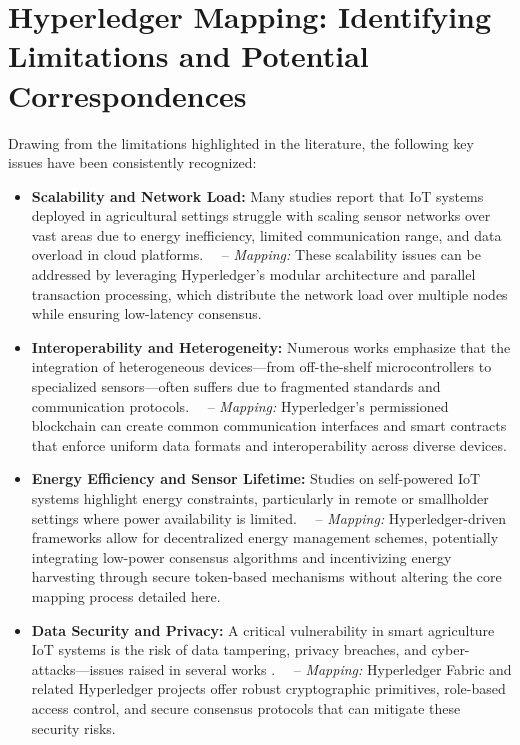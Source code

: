 \documentclass[12pt,onecolumn]{IEEEtran} %
\begin{document}
\section{Hyperledger Mapping: Identifying Limitations and Potential Correspondences}
Drawing from the limitations highlighted in the literature, the following key issues have been consistently recognized:

\begin{itemize}
\item \textbf{Scalability and Network Load:} Many studies \cite{atalla2023iotenabledprecisionagriculture, bayih2022utilizationofinternet, bayih2022utilizationofinternet} report that IoT systems deployed in agricultural settings struggle with scaling sensor networks over vast areas due to energy inefficiency, limited communication range, and data overload in cloud platforms.  
 – \textit{Mapping:} These scalability issues can be addressed by leveraging Hyperledger’s modular architecture and parallel transaction processing, which distribute the network load over multiple nodes while ensuring low-latency consensus.

\item \textbf{Interoperability and Heterogeneity:} Numerous works \cite{bayih2022utilizationofinternet, bayih2022utilizationofinternet, bayih2022utilizationofinternet} emphasize that the integration of heterogeneous devices—from off-the-shelf microcontrollers to specialized sensors—often suffers due to fragmented standards and communication protocols.  
 – \textit{Mapping:} Hyperledger’s permissioned blockchain can create common communication interfaces and smart contracts that enforce uniform data formats and interoperability across diverse devices.

\item \textbf{Energy Efficiency and Sensor Lifetime:} Studies on self-powered IoT systems \cite{raju2022aselfpoweredrealtime, bayih2022utilizationofinternet} highlight energy constraints, particularly in remote or smallholder settings where power availability is limited.  
 – \textit{Mapping:} Hyperledger-driven frameworks allow for decentralized energy management schemes, potentially integrating low-power consensus algorithms and incentivizing energy harvesting through secure token-based mechanisms without altering the core mapping process detailed here.

\item \textbf{Data Security and Privacy:} A critical vulnerability in smart agriculture IoT systems is the risk of data tampering, privacy breaches, and cyber-attacks—issues raised in several works \cite{abunadi2022trafficawaresecuredcooperative, rahaman2024privacycentricaiand, ouafiq2022datamanagementand}.  
 – \textit{Mapping:} Hyperledger Fabric and related Hyperledger projects offer robust cryptographic primitives, role-based access control, and secure consensus protocols that can mitigate these security risks.


\end{itemize}
\end{document}
